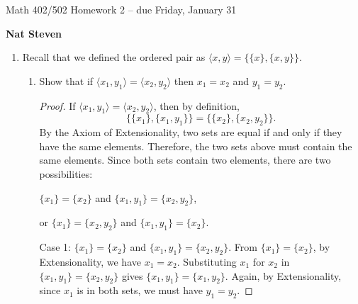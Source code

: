 \documentclass[11pt]{amsart}
\newcommand{\hint}[1]{{\small \em \noindent [Hint: #1]}}
\begin{document}
\begin{center}
{\Large Math 402/502 Homework 2 -- due Friday, January 31}

 \textbf{Nat Steven}
\ \\
\end{center}

 \begin{enumerate}


%

%
%

\item Recall that we defined the ordered pair as $\langle x,y\rangle = \{ \{x\}, \{x,y\}\}$.


\begin{enumerate}
\item Show that if $\langle x_1,y_1 \rangle = \langle x_2, y_2 \rangle$ then $x_1=x_2$ and $y_1=y_2$.

\noindent\begin{proof}

 If $\langle x_1,y_1 \rangle = \langle x_2, y_2 \rangle$, then by definition,
 \[
  \{ \{x_1\}, \{x_1,y_1\}\} = \{ \{x_2\}, \{x_2,y_2\}\}.
 \]
 By the Axiom of Extensionality, two sets are equal if and only if they have the same elements.
 Therefore, the two sets above must contain the same elements.
 Since both sets contain two elements, there are two possibilities:

 $\{x_1\} = \{x_2\}$ and $\{x_1, y_1\} = \{x_2, y_2\}$,

 or $\{x_1\} = \{x_2, y_2\}$ and $\{x_1, y_1\} = \{x_2\}$.

\vspace{1em}
 Case 1: $\{x_1\} = \{x_2\}$ and $\{x_1, y_1\} = \{x_2, y_2\}$.
 From $\{x_1\} = \{x_2\}$, by Extensionality, we have $x_1 = x_2$.
 Substituting $x_1$ for $x_2$ in $\{x_1, y_1\} = \{x_2, y_2\}$ gives $\{x_1, y_1\} = \{x_1, y_2\}$.
 Again, by Extensionality, since $x_1$ is in both sets, we must have $y_1 = y_2$.


\end{proof}
\end{enumerate}
\end{enumerate}
\end{document}

